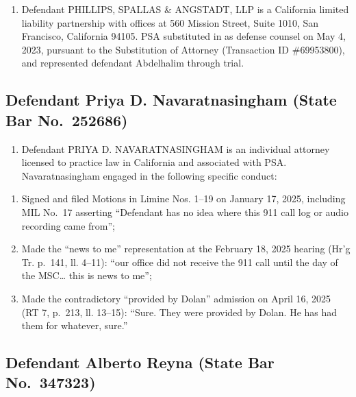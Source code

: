 \begin{enumerate}
\def\labelenumi{\arabic{enumi}.}
\setcounter{enumi}{43}
\tightlist
\item
  Defendant PHILLIPS, SPALLAS \& ANGSTADT, LLP is a California limited liability partnership with offices at 560 Mission Street, Suite 1010, San Francisco, California 94105. PSA substituted in as defense counsel on May 4, 2023, pursuant to the Substitution of Attorney (Transaction ID \#69953800), and represented defendant Abdelhalim through trial.
\end{enumerate}

\subsection{Defendant Priya D. Navaratnasingham (State Bar No.~252686)}\label{defendant-priya-d.-navaratnasingham-state-bar-no.-252686}

\begin{enumerate}
\def\labelenumi{\arabic{enumi}.}
\setcounter{enumi}{44}
\tightlist
\item
  Defendant PRIYA D. NAVARATNASINGHAM is an individual attorney licensed to practice law in California and associated with PSA. Navaratnasingham engaged in the following specific conduct:
\end{enumerate}

\begin{enumerate}
\def\labelenumi{(\alph{enumi})}
\item
  Signed and filed Motions in Limine Nos. 1--19 on January 17, 2025, including MIL No.~17 asserting ``Defendant has no idea where this 911 call log or audio recording came from'';
\item
  Made the ``news to me'' representation at the February 18, 2025 hearing (Hr'g Tr. p.~141, ll. 4--11): ``our office did not receive the 911 call until the day of the MSC\ldots{} this is news to me'';
\item
  Made the contradictory ``provided by Dolan'' admission on April 16, 2025 (RT 7, p.~213, ll. 13--15): ``Sure. They were provided by Dolan. He has had them for whatever, sure.''
\end{enumerate}

\subsection{Defendant Alberto Reyna (State Bar No.~347323)}\label{defendant-alberto-reyna-state-bar-no.-347323}

